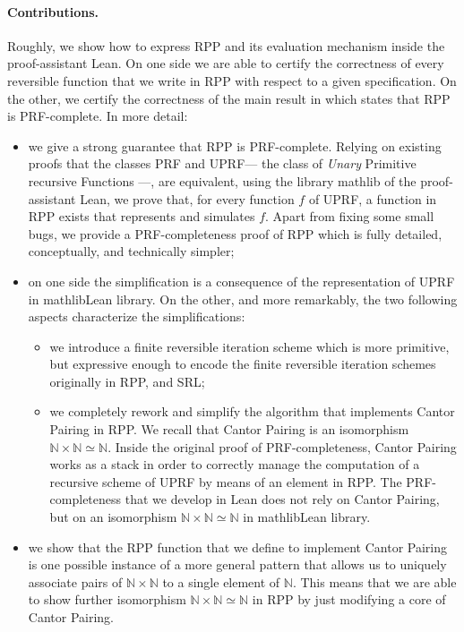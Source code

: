 \documentclass[runningheads]{llncs}
\newcommand{\RPP}{\textsf{RPP}\xspace}
\newcommand{\UPRF}{\textsf{UPRF}\xspace}
\newcommand{\PRF}{\textsf{PRF}\xspace}
\newcommand{\MATHLIB}{\textsf{mathlib}\xspace}
\newcommand{\LEAN}{\textsf{Lean}\xspace}
\newcommand{\SRL}{\textsf{SRL}\xspace}
\begin{document}
\paragraph{Contributions.}
Roughly, we show how to express \RPP and its evaluation mechanism inside the proof-assistant \LEAN \cite{Lean3}. On one side we are able to certify the correctness of every reversible function that we write in \RPP with respect to a given specification. On the other, we certify the correctness of the main result in \cite{DBLP:journals/tcs/PaoliniPR20} which states that \RPP is \PRF-complete. In more detail:
\begin{itemize}
    \item we give a strong guarantee that \RPP is \PRF-complete.
    Relying on existing proofs that the classes \PRF and \UPRF --- the class of \emph{Unary} Primitive recursive Functions ---, are equivalent, using the library \MATHLIB of the proof-assistant \LEAN, we prove that, for every function $ f $ of \UPRF, a function in \RPP exists that represents and simulates $ f $.
    Apart from fixing some small bugs, we provide a \PRF-completeness proof of \RPP \cite{DBLP:journals/tcs/PaoliniPR20} which is fully detailed, conceptually, and technically simpler;

    \item on one side the simplification is a consequence of the representation of \UPRF in \MATHLIB \LEAN library. On the other, and more remarkably,  the two following aspects characterize the simplifications:
    \begin{itemize}
        \item we introduce a finite reversible iteration scheme which is more primitive, but expressive enough to encode the finite reversible iteration schemes originally in \RPP, and \SRL;
        \item we completely rework and simplify the algorithm that implements Cantor Pairing \cite{Cantor1878,DBLP:journals/corr/Szudzik17} in \RPP \cite{DBLP:journals/tcs/PaoliniPR20}.
        We recall that Cantor Pairing is an isomorphism $ \mathbb{N}\times\mathbb{N} \simeq \mathbb{N} $. Inside the original proof of \PRF-completeness, Cantor Pairing works as a stack in order to correctly manage the computation of a recursive scheme of \UPRF by means of an element in \RPP. The \PRF-completeness that we develop in \LEAN does not rely on Cantor Pairing, but on an isomorphism $ \mathbb{N}\times\mathbb{N} \simeq \mathbb{N} $ in \MATHLIB \LEAN library.
    \end{itemize}

    \item we show that the \RPP function that we define to implement Cantor Pairing is one possible instance of a more general pattern that allows us to uniquely associate pairs of $ \mathbb{N}\times\mathbb{N}$ to a single element of $ \mathbb{N}$. This means that we are able to show further isomorphism $ \mathbb{N}\times\mathbb{N}\simeq \mathbb{N}$ in \RPP by just modifying a core of Cantor Pairing.
\end{itemize}
\end{document}
